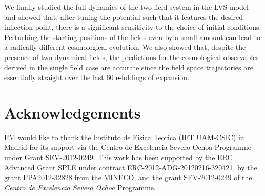 \documentclass[11pt,a4paper]{article}
\begin{document}
We finally studied the full dynamics of the two field system in the LVS model and showed that, after tuning the potential such that it features the desired inflection point, there is a significant sensitivity to the choice of initial conditions. Perturbing the starting positions of the fields even by a small amount can lead to a radically different cosmological evolution. We also showed that, despite the presence of two dynamical fields, the predictions for the cosmological observables derived in the single field case are accurate since the field space trajectories are essentially straight over the last $60$ e-foldings of expansion.



\section*{Acknowledgements}

FM would like to thank the Instituto de Fisica Teorica (IFT UAM-CSIC) in Madrid for its support via the Centro de Excelencia Severo
Ochoa Programme under Grant SEV-2012-0249. This work has been supported by the ERC Advanced Grant SPLE under contract ERC-2012-ADG-20120216-320421, by the grant FPA2012-32828 from the MINECO, and the grant SEV-2012-0249 of the \textit{Centro de Excelencia Severo Ochoa} Programme.
\end{document}
